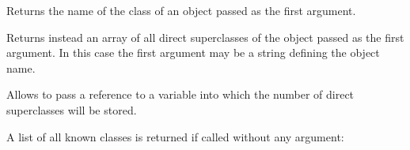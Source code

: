 Returns the name of the class of an object passed as the first argument.

Returns instead an array of all direct superclasses of the object
  passed as the first argument.
In this case the first argument may be a string defining the object name. 

Allows to pass a reference to a variable into which the number of direct
  superclasses will be stored.


A list of all known classes is returned if called without any argument:
